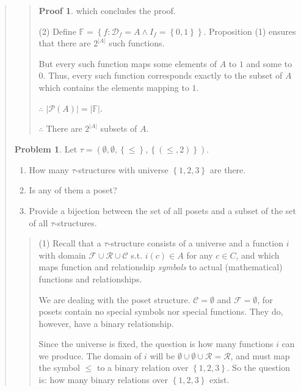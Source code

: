 \documentclass[a4paper, 12pt]{article}
\theoremstyle{definition}
\newtheorem{problem}{Problem}
\theoremstyle{definition}
\theoremstyle{definition}
\newtheorem{pro}{Proof}
\begin{document}
\begin{quote}
\begin{quote}
\begin{pro}
    which concludes the proof. 

    (2) Define $\mathbb{F} = \left\{ f : \mathcal{D}_f = A \land I_f = \left\{
    0, 1 \right\}  \right\} $. Proposition (1) ensures that there are $2^{|A|}$
    such functions. 

    But every such function maps some elements of $A$ to $1$ and 
    some to $0$. Thus, every such function corresponds exactly
    to the subset of $A$ which contains the elements mapping to 
    $1$.

    $\therefore $ $|\mathcal{P}(A)| = |\mathbb{F}|$.

    $\therefore $ There are $2^{|A|}$ subsets of $A$.
\end{pro}

\end{quote}
\normalsize

\begin{problem}
    Let $\tau = \left( \emptyset, \emptyset, \left\{ \leq \right\}, \left\{ (\leq, 2) \right\}   \right) $.  
    \begin{enumerate}
        \item How many $\tau$-structures with universe $\left\{ 1, 2, 3 \right\} $ are there. 
        \item Is any of them a poset? 

        \item Provide a bijection between the set of all posets and a subset 
            of  the set of all $\tau$-structures.
    \end{enumerate}
\end{problem}


\small
\begin{quote}

(1) Recall that a $\tau$-structure consists of a universe and a function $i$ with
domain $\mathcal{F} \cup \mathcal{R} \cup \mathcal{C}$ s.t. $i(c) \in A$ for
any $c \in C$, and which maps function and relationship \textit{symbols} to
actual (mathematical) functions and relationships.

We are dealing with the poset structure. $\mathcal{C} =\emptyset$ and
$\mathcal{F} = \emptyset$, for posets contain no special symbols nor special
functions. They do, however, have a binary relationship.

Since the universe is fixed, the question is how many functions $i$ can we
produce. The domain of $i$ will be $\emptyset \cup  \emptyset \cup \mathcal{R}
= \mathcal{R}$, and must map the symbol $\leq$ to a binary relation over
$\left\{ 1, 2, 3 \right\} $. So the question is: how many binary relations over
$\left\{ 1, 2, 3 \right\} $ exist. 


\end{quote}
\end{quote}
\end{document}
